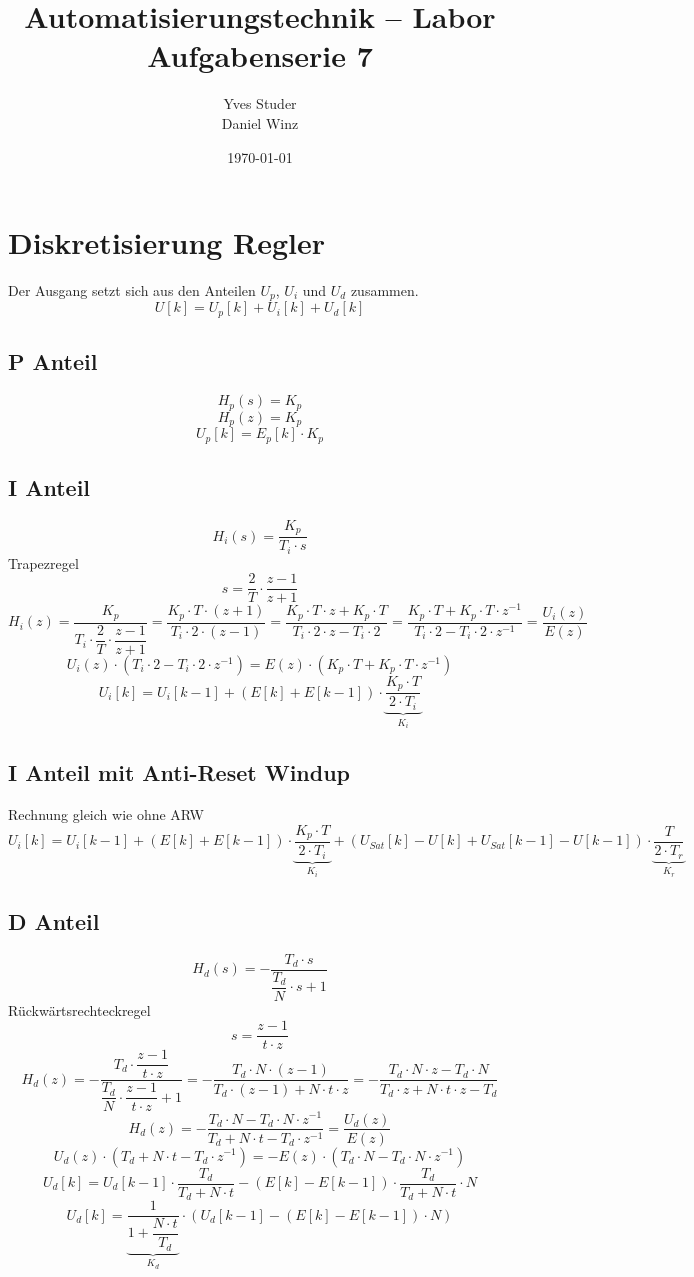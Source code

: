 \documentclass[a4,paper,fleqn]{article}
\title{Automatisierungstechnik -- Labor Aufgabenserie 7}
\date{\today}
\author{Yves Studer\\Daniel Winz}
\begin{document}
\maketitle
\clearpage
\section{Diskretisierung Regler}
Der Ausgang setzt sich aus den Anteilen $U_p$, $U_i$ und $U_d$ zusammen. 
\[ U[k] = U_p[k] + U_i[k] + U_d[k] \]

\subsection{P Anteil}
\[ H_p(s) = K_p \]
\[ H_p(z) = K_p \]
\[ U_p[k] = E_p[k] \cdot K_p \]

\subsection{I Anteil}
\[ H_i(s) = \frac{K_p}{T_i \cdot s} \]
Trapezregel
\[ s = \frac{2}{T} \cdot \frac{z - 1}{z + 1} \]
\[ H_i(z) = \frac{K_p}{T_i \cdot \dfrac{2}{T} \cdot \dfrac{z - 1}{z + 1}}
 = \frac{K_p \cdot T \cdot (z + 1)}{T_i \cdot 2 \cdot (z - 1)}
 = \frac{K_p \cdot T \cdot z + K_p \cdot T}{T_i \cdot 2 \cdot z - T_i \cdot 2}
 = \frac{K_p \cdot T + K_p \cdot T \cdot z^{-1}}{T_i \cdot 2 - T_i \cdot 2 \cdot z^{-1}}
 = \frac{U_i(z)}{E(z)} \]
\[ U_i(z) \cdot (T_i \cdot 2 - T_i \cdot 2 \cdot z^{-1})
 = E(z) \cdot (K_p \cdot T + K_p \cdot T \cdot z^{-1}) \]
\[ U_i[k] =  U_i[k-1] + \left(E[k] + E[k-1]\right) \cdot
 \underbrace{\frac{K_p \cdot T}{2 \cdot T_i}}_{K_i} \]

\subsection{I Anteil mit Anti-Reset Windup}
Rechnung gleich wie ohne ARW
\[ U_i[k] =  U_i[k-1] + \left(E[k] + E[k-1]\right) \cdot
 \underbrace{\frac{K_p \cdot T}{2 \cdot T_i}}_{K_i}
 + \left(U_{Sat}[k] - U[k] + U_{Sat}[k-1] - U[k-1]\right) \cdot
 \underbrace{\frac{T}{2 \cdot T_r}}_{K_r} \]

\subsection{D Anteil}
\[ H_d(s) = - \frac{T_d \cdot s}{\dfrac{T_d}{N} \cdot s + 1} \]
Rückwärtsrechteckregel
\[ s = \frac{z - 1}{t \cdot z} \]
\[ H_d(z) = -\frac{T_d \cdot \dfrac{z - 1}{t \cdot z}}{\dfrac{T_d}{N} \cdot \dfrac{z - 1}{t \cdot z} + 1}
 = -\frac{T_d \cdot N \cdot (z - 1)}{T_d \cdot (z - 1) + N \cdot t \cdot z}
 = -\frac{T_d \cdot N \cdot z - T_d \cdot N}{T_d \cdot z + N \cdot t \cdot z - T_d} \]
\[ H_d(z) = -\frac{T_d \cdot N - T_d \cdot N \cdot z^{-1}}{T_d + N \cdot t - T_d \cdot z^{-1}}
 = \frac{U_d(z)}{E(z)} \]
\[ U_d(z) \cdot (T_d + N \cdot t - T_d \cdot z^{-1})
 = - E(z) \cdot (T_d \cdot N - T_d \cdot N \cdot z^{-1}) \]
\[ U_d[k] = U_d[k-1] \cdot \frac{T_d}{T_d + N \cdot t}
 - \left(E[k] - E[k-1]\right) \cdot \frac{T_d}{T_d + N \cdot t} \cdot N \]
\[ U_d[k] = \underbrace{\frac{1}{1 + \dfrac{N \cdot t}{T_d}}}_{K_d} \cdot \left(U_d[k-1]
 - \left(E[k] - E[k-1]\right) \cdot N\right) \]
\end{document}
